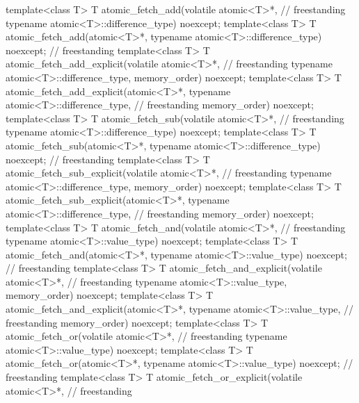 \begin{codeblock}
{  template<class T>
    T atomic_fetch_add(volatile atomic<T>*,                                         // freestanding
                       typename atomic<T>::difference_type) noexcept;
  template<class T>
    T atomic_fetch_add(atomic<T>*, typename atomic<T>::difference_type) noexcept;   // freestanding
  template<class T>
    T atomic_fetch_add_explicit(volatile atomic<T>*,                                // freestanding
                                typename atomic<T>::difference_type,
                                memory_order) noexcept;
  template<class T>
    T atomic_fetch_add_explicit(atomic<T>*, typename atomic<T>::difference_type,    // freestanding
                                memory_order) noexcept;
  template<class T>
    T atomic_fetch_sub(volatile atomic<T>*,                                         // freestanding
                       typename atomic<T>::difference_type) noexcept;
  template<class T>
    T atomic_fetch_sub(atomic<T>*, typename atomic<T>::difference_type) noexcept;   // freestanding
  template<class T>
    T atomic_fetch_sub_explicit(volatile atomic<T>*,                                // freestanding
                                typename atomic<T>::difference_type,
                                memory_order) noexcept;
  template<class T>
    T atomic_fetch_sub_explicit(atomic<T>*, typename atomic<T>::difference_type,    // freestanding
                                memory_order) noexcept;
  template<class T>
    T atomic_fetch_and(volatile atomic<T>*,                                         // freestanding
                       typename atomic<T>::value_type) noexcept;
  template<class T>
    T atomic_fetch_and(atomic<T>*, typename atomic<T>::value_type) noexcept;        // freestanding
  template<class T>
    T atomic_fetch_and_explicit(volatile atomic<T>*,                                // freestanding
                                typename atomic<T>::value_type,
                                memory_order) noexcept;
  template<class T>
    T atomic_fetch_and_explicit(atomic<T>*, typename atomic<T>::value_type,         // freestanding
                                memory_order) noexcept;
  template<class T>
    T atomic_fetch_or(volatile atomic<T>*,                                          // freestanding
                      typename atomic<T>::value_type) noexcept;
  template<class T>
    T atomic_fetch_or(atomic<T>*, typename atomic<T>::value_type) noexcept;         // freestanding
  template<class T>
    T atomic_fetch_or_explicit(volatile atomic<T>*,                                 // freestanding
}
\end{codeblock}

